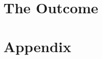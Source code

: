 






\part{The Outcome}






%
%
% 
% 
% 



\appendix

\part{Appendix} %



\cleardoublepage %

%



